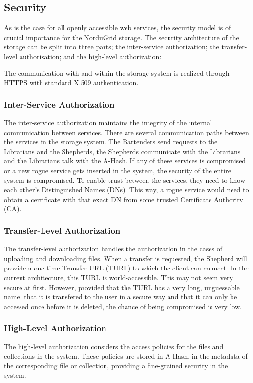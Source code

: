 \documentclass[preprint,12pt]{elsarticle}
\begin{document}
\subsection{Security}
\label{sec:security}
As is the case for all openly accessible web services, the security
model is of crucial importance for the NorduGrid storage. The security
architecture of the storage can be split into three parts; the
inter-service authorization; the transfer-level authorization; and the
high-level authorization:

The communication with and within the storage system is realized
through HTTPS with standard X.509 authentication.

\subsubsection{Inter-Service Authorization}
The inter-service authorization maintains the integrity of the
internal communication between services. There are several
communication paths between the services in the storage system. The
Bartenders send requests to the Librarians and the Shepherds, the
Shepherds communicate with the Librarians and the Librarians talk with
the A-Hash. If any of these services is compromised or a new rogue
service gets inserted in the system, the security of the entire system
is compromised. To enable trust between the services, they need to
know each other's Distinguished Names (DNs). This way, a rogue service
would need to obtain a certificate with that exact DN from some
trusted Certificate Authority (CA).

\subsubsection{Transfer-Level Authorization}
The transfer-level authorization handles the authorization in the
cases of uploading and downloading files. When a transfer is
requested, the Shepherd will provide a one-time Transfer URL (TURL) to
which the client can connect. In the current architecture, this TURL
is world-accessible. This may not seem very secure at first. However,
provided that the TURL has a very long, unguessable name, that it is
transfered to the user in a secure way and that it can only be
accessed once before it is deleted, the chance of being compromised is
very low.

\subsubsection{High-Level Authorization}
The high-level authorization considers the access policies for the
files and collections in the system. These policies are stored in
A-Hash, in the metadata of the corresponding file or collection,
providing a fine-grained security in the system.
\end{document}
